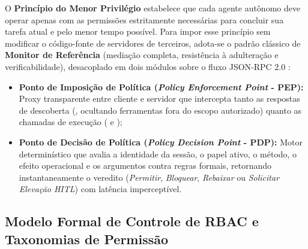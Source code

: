 O \textbf{Princípio do Menor Privilégio} estabelece que cada agente autônomo deve operar apenas com as permissões estritamente necessárias para concluir sua tarefa atual e pelo menor tempo possível. Para impor esse princípio sem modificar o código-fonte de servidores de terceiros, adota-se o padrão clássico de \textbf{Monitor de Referência} (mediação completa, resistência à adulteração e verificabilidade), desacoplado em dois módulos sobre o fluxo JSON-RPC 2.0 \cite{singh2026mcpsecure}:
\begin{itemize}
  \item \textbf{Ponto de Imposição de Política (\textit{Policy Enforcement Point} - PEP):} Proxy transparente entre cliente e servidor que intercepta tanto as respostas de descoberta (, ocultando ferramentas fora do escopo autorizado) quanto as chamadas de execução ( e );
  \item \textbf{Ponto de Decisão de Política (\textit{Policy Decision Point} - PDP):} Motor determinístico que avalia a identidade da sessão, o papel ativo, o método, o efeito operacional e os argumentos contra regras formais, retornando instantaneamente o veredito (\textit{Permitir}, \textit{Bloquear}, \textit{Rebaixar} ou \textit{Solicitar Elevação HITL}) com latência imperceptível.
\end{itemize}

\subsection{Modelo Formal de Controle de RBAC e Taxonomias de Permissão}
\label{subsec:modelo_rbac}

